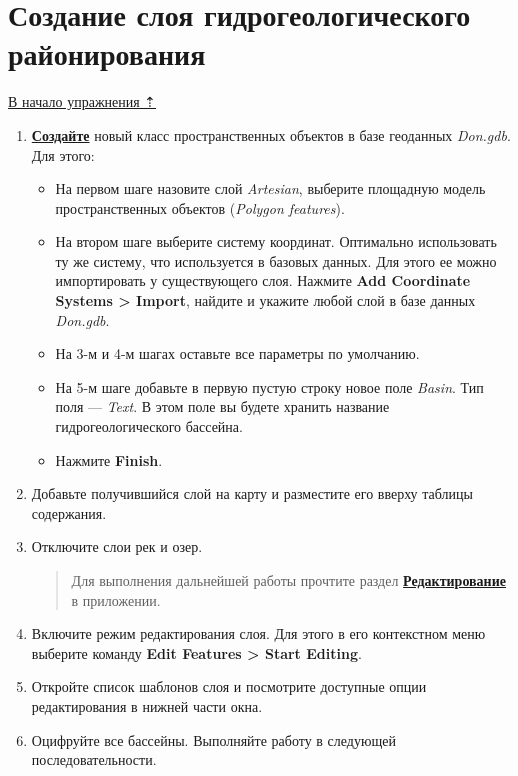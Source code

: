 \documentclass[12pt,]{book}
\begin{document}
\hypertarget{map-ref-hydrogeologic-regions}{%
\section{Создание слоя гидрогеологического районирования}\label{map-ref-hydrogeologic-regions}}

\protect\hyperlink{map-ref-hydrogeologic}{В начало упражнения ⇡}

\begin{enumerate}
\def\labelenumi{\arabic{enumi}.}
\item
  \textbf{\protect\hyperlink{manual-gdb-create-class}{Создайте}} новый класс пространственных объектов в базе геоданных \emph{Don.gdb}. Для этого:

  \begin{itemize}
  \item
    На первом шаге назовите слой \emph{Artesian}, выберите площадную модель пространственных объектов (\emph{Polygon features}).
  \item
    На втором шаге выберите систему координат. Оптимально использовать ту же систему, что используется в базовых данных. Для этого ее можно импортировать у существующего слоя. Нажмите \textbf{Add Coordinate Systems \textgreater{} Import}, найдите и укажите любой слой в базе данных \emph{Don.gdb}.
  \item
    На 3-м и 4-м шагах оставьте все параметры по умолчанию.
  \item
    На 5-м шаге добавьте в первую пустую строку новое поле \emph{Basin}. Тип поля --- \emph{Text}. В этом поле вы будете хранить название гидрогеологического бассейна.
  \item
    Нажмите \textbf{Finish}.
  \end{itemize}
\item
  Добавьте получившийся слой на карту и разместите его вверху таблицы содержания.
\item
  Отключите слои рек и озер.

  \begin{quote}
  Для выполнения дальнейшей работы прочтите раздел \textbf{\protect\hyperlink{manual-edit}{Редактирование}} в приложении.
  \end{quote}
\item
  Включите режим редактирования слоя. Для этого в его контекстном меню выберите команду \textbf{Edit Features \textgreater{} Start Editing}.
\item
  Откройте список шаблонов слоя и посмотрите доступные опции редактирования в нижней части окна.
\item
  Оцифруйте все бассейны. Выполняйте работу в следующей последовательности.


\end{enumerate}
\end{document}
